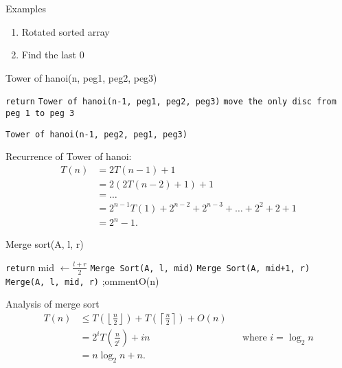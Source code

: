 \documentclass[../../main/main.tex]{subfiles}
\begin{document}
Examples
\begin{enumerate}
	\item Rotated sorted array
	\item Find the last 0
\end{enumerate}

\begin{algorithm}[H]
	\caption{Tower of hanoi(n, peg1, peg2, peg3)}
	\begin{algorithmic}[1]
		\texttt{return}
		\Else
		\State \texttt{Tower of hanoi(n-1, peg1, peg2, peg3)} 
		\State \texttt{move the only disc from peg 1 to peg 3} 

		\State\texttt{Tower of hanoi(n-1, peg2, peg1, peg3)} 
		\EndIf
	\end{algorithmic}
\end{algorithm}

\begin{theorem}
	Recurrence of Tower of hanoi:
	\begin{align*}
		T(n) & = 2T(n-1) + 1                                              \\
		     & = 2(2T(n-2) + 1) + 1                                       \\
		     & = \ldots                                                   \\
		     & = 2^{n-1}T(1) +  2^{n-2} + 2^{n-3}  + \ldots + 2^2 + 2 + 1 \\
		     & = 2^{n} - 1
		.\end{align*}

\end{theorem}
\begin{algorithm}[H]
	\caption{Merge sort(A, l, r)}
	\begin{algorithmic}[1]
		\texttt{return}
		\Else
		\State mid $\gets \frac{l+r}{2}$
		\State \texttt{Merge Sort(A, l, mid)} 
		\State \texttt{Merge Sort(A, mid+1, r)} 
		\State \texttt{Merge(A, l, mid, r)} \C ;omment{O(n)}
		\EndIf
	\end{algorithmic}
\end{algorithm}
\begin{theorem}
	Analysis of merge sort
	\begin{align*}
		T(n) & \le  T(\left\lfloor \frac{n}{2} \right\rfloor) + T(\left\lceil \frac{n}{2} \right\rceil ) + O(n)                                 \\
		     & = 2^{i}T(\frac{n}{2^{i}}) + in                                                                   &  & \text{where $i = \log_2n$} \\
		     & = n\log_2n + n
		.\end{align*}
\end{theorem}
\end{document}
